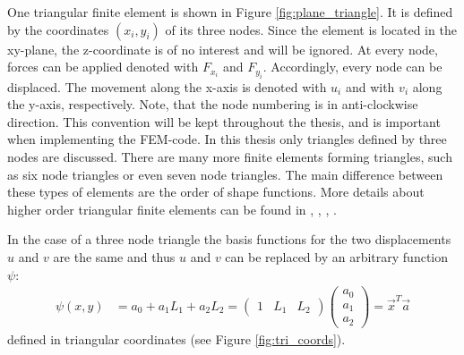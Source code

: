   One triangular finite element is shown in Figure \ref{fig:plane_triangle}. It is defined by the coordinates $(x_i,y_i)$ of its three nodes. Since the element is located in the xy-plane, the z-coordinate is of no interest and will be ignored. At every node, forces can be applied denoted with $F_{x_i}$ and $F_{y_i}$. Accordingly, every node can be displaced. The movement along the x-axis is denoted with $u_i$ and with $v_i$ along the y-axis, respectively. Note, that the node numbering is in anti-clockwise direction. This convention will be kept throughout the thesis, and is important when implementing the FEM-code.
  In this thesis only triangles defined by three nodes are discussed. There are many more finite elements forming triangles, such as six node triangles or even seven node triangles. The main difference between these types of elements are the order of shape functions. More details about higher order triangular finite elements can be found in \cite{zienkiewicz2000finite}, \cite{bergan1985triangular}, \cite{cook2002concepts}, \cite{braess2007finite}.
  
  In the case of a three node triangle the basis functions for the two displacements $u$ and $v$ are the same and thus $u$ and $v$ can be replaced by an arbitrary function $\psi$\cite{steinke2005finite}:
  \begin{align}\label{eq:t3_ansatz}
  \psi(x,y) &= a_0 + a_1L_1 + a_2L_2 = \begin{pmatrix}
  1 & L_1 & L_2
  \end{pmatrix} \begin{pmatrix}
  a_0 \\ a_1 \\ a_2
  \end{pmatrix} = \vec{x}^T \vec{a}
  \end{align}
  defined in triangular coordinates (see Figure \ref{fig:tri_coords}).
  
